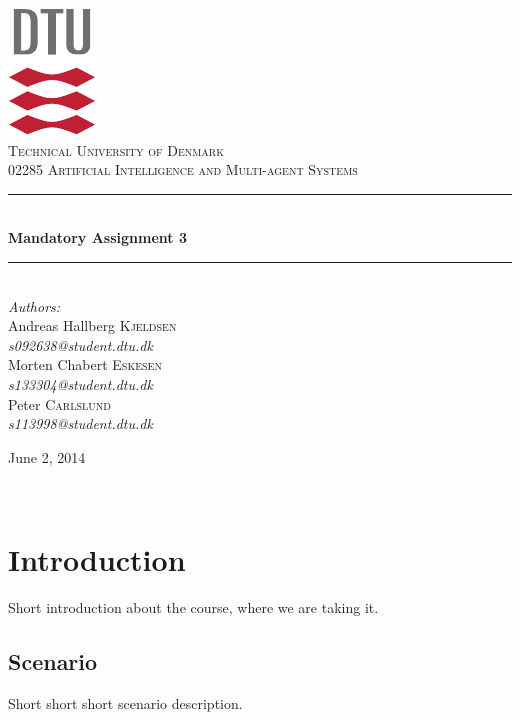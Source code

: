 \documentclass[11pt]{article}
\newcommand{\HRule}{\rule{\linewidth}{0.5mm}}
\begin{document}
\begin{titlepage}
\begin{center}

\includegraphics[scale=2.0]{../GFX/dtu_logo.pdf}\\[1cm]

\textsc{\LARGE Technical University of Denmark}\\[1.5cm]

\textsc{\Large 02285 Artificial Intelligence and Multi-agent Systems}\\[0.5cm]

\HRule \\[0.4cm]
{\huge \bfseries Mandatory Assignment 3}\\[0.1cm]
\HRule \\[1.5cm]

\large
\emph{Authors:}
\\[10pt]
Andreas Hallberg \textsc{Kjeldsen}\\
\emph{s092638@student.dtu.dk}
\\[10pt]
Morten Chabert \textsc{Eskesen}\\
\emph{s133304@student.dtu.dk}
\\[10pt]
Peter \textsc{Carlslund}\\
\emph{s113998@student.dtu.dk}

\vfill

{\large June 2, 2014}

\end{center}
\end{titlepage}

${}$
\vspace{-.55cm}
\section{Introduction}
Short introduction about the course, where we are taking it.

\subsection{Scenario}
Short short short scenario description.
\end{document}
